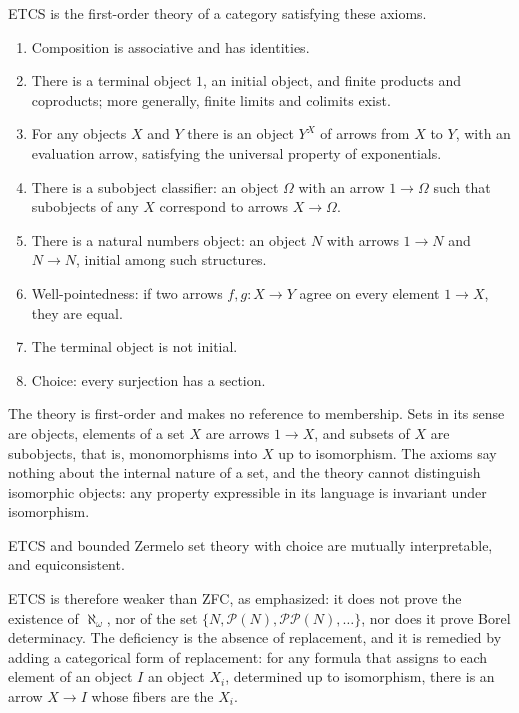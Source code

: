 \documentclass{situationist-preprint}
\begin{document}
\begin{definition}\label{d:etcs}
ETCS is the first-order theory of a category satisfying these axioms.
\begin{enumerate}[label=(\roman*)]
\item Composition is associative and has identities.
\item There is a terminal object $1$, an initial object, and finite products and coproducts; more generally, finite limits and colimits exist.
\item For any objects $X$ and $Y$ there is an object $Y^X$ of arrows from $X$ to $Y$, with an evaluation arrow, satisfying the universal property of exponentials.
\item There is a subobject classifier: an object $\Omega$ with an arrow $1 \to \Omega$ such that subobjects of any $X$ correspond to arrows $X \to \Omega$.
\item There is a natural numbers object: an object $N$ with arrows $1 \to N$ and $N \to N$, initial among such structures.
\item Well-pointedness: if two arrows $f, g\colon X \to Y$ agree on every element $1 \to X$, they are equal.
\item The terminal object is not initial.
\item Choice: every surjection has a section.
\end{enumerate}
\end{definition}

The theory is first-order and makes no reference to membership. Sets in its sense are objects, elements of a set $X$ are arrows $1 \to X$, and subsets of $X$ are subobjects, that is, monomorphisms into $X$ up to isomorphism. The axioms say nothing about the internal nature of a set, and the theory cannot distinguish isomorphic objects: any property expressible in its language is invariant under isomorphism.

\begin{proposition}\label{p:bz}
ETCS and bounded Zermelo set theory with choice are mutually interpretable, and equiconsistent.
\end{proposition}

ETCS is therefore weaker than ZFC, as \citet{Mathias2001} emphasized: it does not prove the existence of $\aleph_\omega$, nor of the set $\{N, \mathcal{P}(N), \mathcal{P}\mathcal{P}(N), \dots\}$, nor does it prove Borel determinacy. The deficiency is the absence of replacement, and it is remedied by adding a categorical form of replacement: for any formula that assigns to each element of an object $I$ an object $X_i$, determined up to isomorphism, there is an arrow $X \to I$ whose fibers are the $X_i$.
\end{document}
